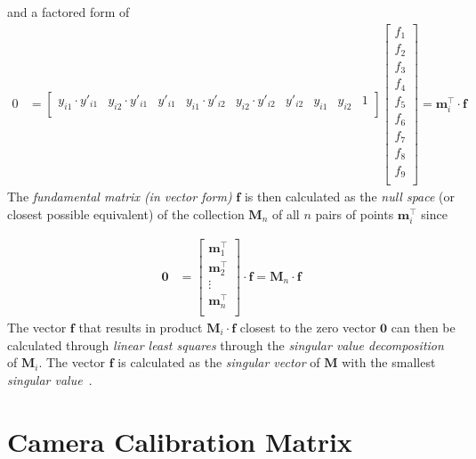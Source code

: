 \noindent and a factored form of 
\begin{equation*}
\begin{split}
0&=\begin{bmatrix}
{y_{i1}\cdot y'_{i1}} &%
{y_{i2}\cdot y'_{i1}} &%
{y'_{i1}} &%
{y_{i1}\cdot y'_{i2}} &%
{y_{i2}\cdot y'_{i2}} &%
{y'_{i2}} &%
{y_{i1}} &%
{y_{i2}} &%
1\\ %
\end{bmatrix}\begin{bmatrix}
f_1\\%
f_2\\%
f_3\\%
f_4\\%
f_5\\%
f_6\\%
f_7\\%
f_8\\%
f_9\\%
\end{bmatrix}
=
\mathbf{m}{^\intercal_i}\cdot\mathbf{f}
\end{split}
\end{equation*}
\noindent The \textit{fundamental matrix (in vector form)} $\mathbf{f}$ is then calculated as the \textit{null space} (or closest possible equivalent) of the collection $\mathbf{M}_n$ of all $n$ pairs of points $\mathbf{m}{^\intercal_i}$ since

\begin{equation*}\begin{split}
\mathbf{0} &=
\begin{bmatrix}
\mathbf{m}{^\intercal_1}\\
\mathbf{m}{^\intercal_2}\\
\vdots\\
\mathbf{m}{^\intercal_n}\\
\end{bmatrix}
\cdot \mathbf{f}
=\mathbf{M}_n\cdot \mathbf{f}
\end{split}\end{equation*}
\noindent The vector $\mathbf{f}$ that results in product $\mathbf{M}_i\cdot\mathbf{f}$ closest to the zero vector $\mathbf{0}$ can then be calculated through \textit{linear least squares} through the \textit{singular value decomposition} of $\mathbf{M}_i$. The vector $\mathbf{f}$ is calculated as the \textit{singular vector} of $\mathbf{M}$ with the smallest \textit{singular value}~\cite{Hartley2004}.

\section{Camera Calibration Matrix}

